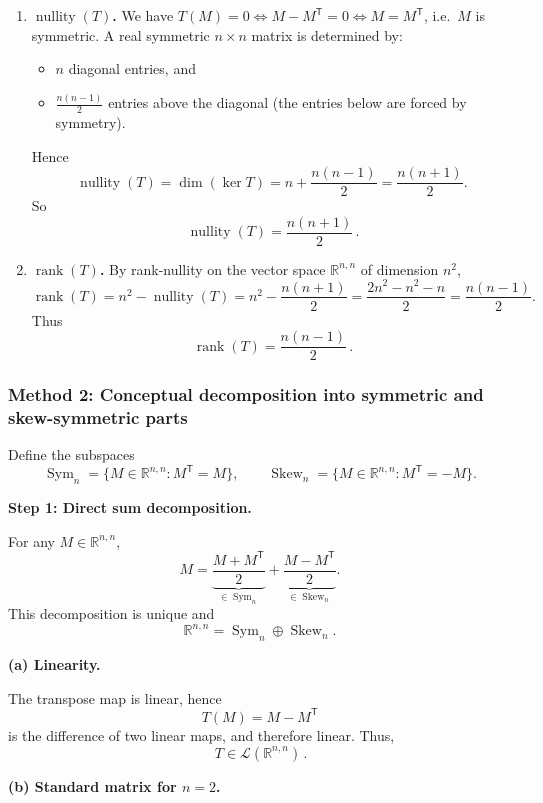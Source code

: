 \documentclass[12pt]{article}
\newcommand{\R}{\mathbb{R}}
\DeclareMathOperator{\rank}{rank}
\DeclareMathOperator{\nullity}{nullity}
\begin{document}
\begin{enumerate}[label=(\alph*)]
\item \textbf{$\nullity(T)$.}
We have $T(M)=0 \iff M-M^{\mathsf{T}}=0 \iff M=M^{\mathsf{T}}$, i.e.\ $M$ is symmetric.
A real symmetric $n\times n$ matrix is determined by:
\begin{itemize}[leftmargin=*]
\item $n$ diagonal entries, and
\item $\frac{n(n-1)}{2}$ entries above the diagonal (the entries below are forced by symmetry).
\end{itemize}
Hence
\[
\nullity(T)=\dim(\ker T)=n+\frac{n(n-1)}{2}=\frac{n(n+1)}{2}.
\]
So
\[
\boxed{\,\nullity(T)=\dfrac{n(n+1)}{2}\,}.
\]

\item \textbf{$\rank(T)$.}
By rank-nullity on the vector space $\R^{n,n}$ of dimension $n^2$,
\[
\rank(T)=n^2-\nullity(T)=n^2-\frac{n(n+1)}{2}
=\frac{2n^2-n^2-n}{2}
=\frac{n(n-1)}{2}.
\]
Thus
\[
\boxed{\,\rank(T)=\dfrac{n(n-1)}{2}\,}.
\]
\end{enumerate}

\newpage
\subsubsection{Method 2: Conceptual decomposition into symmetric and skew-symmetric parts}

Define the subspaces
\[
\operatorname{Sym}_n
=\{M\in\mathbb R^{n,n}: M^{\mathsf T}=M\},
\qquad
\operatorname{Skew}_n
=\{M\in\mathbb R^{n,n}: M^{\mathsf T}=-M\}.
\]

\medskip
\noindent
\textbf{Step 1: Direct sum decomposition.}

For any $M\in\mathbb R^{n,n}$,
\[
M
=
\underbrace{\frac{M+M^{\mathsf T}}{2}}_{\in \operatorname{Sym}_n}
+
\underbrace{\frac{M-M^{\mathsf T}}{2}}_{\in \operatorname{Skew}_n}.
\]
This decomposition is unique and
\[
\mathbb R^{n,n}
=
\operatorname{Sym}_n
\oplus
\operatorname{Skew}_n.
\]

\medskip
\noindent
\textbf{(a) Linearity.}

The transpose map is linear, hence
\[
T(M)=M-M^{\mathsf T}
\]
is the difference of two linear maps, and therefore linear.
Thus,
\[
\boxed{\,T\in \mathcal L(\mathbb R^{n,n})\,}.
\]

\medskip
\noindent
\textbf{(b) Standard matrix for $n=2$.}
\end{document}
